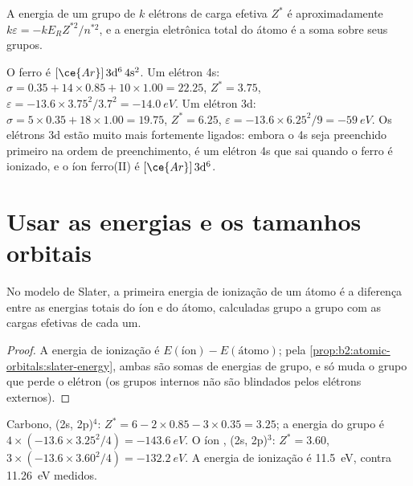 \begin{proposition}\label{prop:b2:atomic-orbitals:slater-energy}
A energia de um grupo de $k$ elétrons de carga efetiva $Z^*$ é aproximadamente
$k\varepsilon = -kE_RZ^{*2}/n^{*2}$, e a energia eletrônica total do átomo é a
soma sobre seus grupos.
\end{proposition}

\admitted

\begin{example}\label{ex:b2:atomic-orbitals:iron}
O ferro é $[\ce{Ar}]\,3\mathrm d^6\,4\mathrm s^2$. Um elétron 4s: $\sigma = 0.35 + 14
\times 0.85 + 10 \times 1.00 = 22.25$, $Z^* = 3.75$, $\varepsilon = -13.6 \times
3.75^2/3.7^2 = \qty{-14.0}{eV}$. Um elétron 3d: $\sigma = 5 \times 0.35 + 18 \times 1.00 =
19.75$, $Z^* = 6.25$, $\varepsilon = -13.6 \times 6.25^2/9 = \qty{-59}{eV}$. Os
elétrons 3d estão muito mais fortemente ligados: embora o 4s seja preenchido
primeiro na ordem de preenchimento, é um elétron 4s que sai quando o ferro é
ionizado, e o íon ferro(II) é $[\ce{Ar}]\,3\mathrm d^6$.
\end{example}

\section{Usar as energias e os tamanhos orbitais}

\begin{proposition}\label{prop:b2:atomic-orbitals:ionisation}
No modelo de Slater, a primeira energia de ionização de um átomo é a diferença
entre as energias totais do íon e do átomo, calculadas grupo a grupo com as
cargas efetivas de cada um.
\end{proposition}

\begin{proof}
A energia de ionização é $E(\text{íon}) - E(\text{átomo})$; pela
\cref{prop:b2:atomic-orbitals:slater-energy}, ambas são somas de energias de
grupo, e só muda o grupo que perde o elétron (os grupos internos não são
blindados pelos elétrons externos).
\end{proof}

\begin{example}[O carbono]\label{ex:b2:atomic-orbitals:carbon}
Carbono, (2s, 2p)$^4$: $Z^* = 6 - 2 \times 0.85 - 3 \times 0.35 = 3.25$; a energia do grupo é
$4 \times (-13.6 \times 3.25^2/4) = \qty{-143.6}{eV}$. O íon , (2s, 2p)$^3$: $Z^* =
3.60$, $3 \times (-13.6 \times 3.60^2/4) = \qty{-132.2}{eV}$. A energia de ionização é
\qty{11.5}{eV}, contra \qty{11.26}{eV} medidos.
\end{example}

